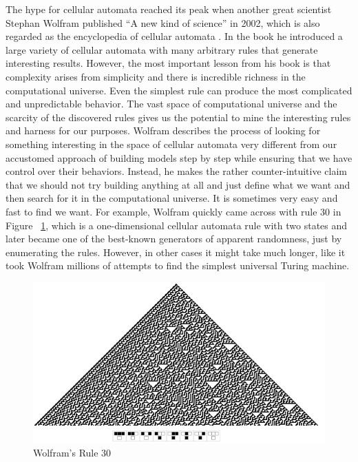 \documentclass[12pt]{article}
\numberwithin{figure}{section} %
\begin{document}
The hype for cellular automata reached its peak when another great scientist Stephan Wolfram published “A new kind of science” in 2002, which is also regarded as the encyclopedia of cellular automata \cite{A new kind of Science}. In the book he introduced a large variety of cellular automata with many arbitrary rules that generate interesting results. However, the most important lesson from his book is that complexity arises from simplicity and there is incredible richness in the computational universe. Even the simplest rule can produce the most complicated and unpredictable behavior. The vast space of computational universe and the scarcity of the discovered rules gives us the potential to mine the interesting rules and harness for our purposes. Wolfram describes the process of looking for something interesting in the space of cellular automata very different from our accustomed approach of building models step by step while ensuring that we have control over their behaviors. Instead, he makes the rather counter-intuitive claim that we should not try building anything at all and just define what we want and then search for it in the computational universe. It is sometimes very easy and fast to find we want. For example, Wolfram quickly came across with rule 30 \cite{Rule 30} in Figure ~\ref{fig:Rule 30}, which is a one-dimensional cellular automata rule with two states and later became one of the best-known generators of apparent randomness, just by enumerating the rules. However, in other cases it might take much longer, like it took Wolfram millions of attempts to find the simplest universal Turing machine. 
 
\begin{figure}[H]
\includegraphics[width=\linewidth]{Section2/1}
\caption{Wolfram’s Rule 30}
\vspace{-1.5em}
\label{fig:Rule 30}
\end{figure}
\end{document}
